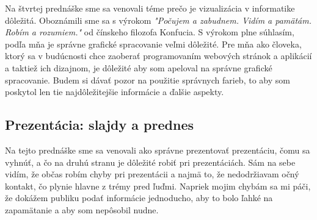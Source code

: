 \documentclass[10pt,twoside,slovak,a4paper]{article}
\begin{document}
Na štvrtej prednáške sme sa venovali téme prečo je vizualizácia v informatike dôležitá. Oboznámili sme sa s výrokom \textit{"Počujem a zabudnem. Vidím a pamätám. Robím a rozumiem."} od čínskeho filozofa Konfucia. S výrokom plne súhlasím, podľa mňa je správne grafické spracovanie veľmi dôležité. Pre mňa ako človeka, ktorý sa v budúcnosti chce zaoberať programovaním webových stránok a aplikácií a taktiež ich dizajnom, je dôležité aby som apeloval na správne grafické spracovanie. Budem si dávať pozor na použitie správnych farieb, to aby som poskytol len tie najdôležitejšie informácie a ďalšie aspekty.

\subsection{Prezentácia: slajdy a prednes}

Na tejto prednáške sme sa venovali ako správne prezentovať prezentáciu, čomu sa vyhnúť, a čo na druhú stranu je dôležité robiť pri prezentáciách. Sám na sebe vidím, že občas robím chyby pri prezentácii a najmä to, že nedodržiavam očný kontakt, čo plynie hlavne z trémy pred ľuďmi. Napriek mojim chybám sa mi páči, že dokážem publiku podať informácie jednoducho, aby to bolo ľahké na zapamätanie a aby som nepôsobil nudne.


\end{document}
